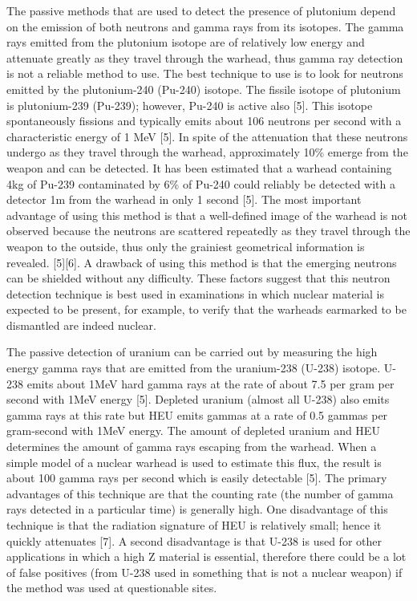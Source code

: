 \documentclass[twoside,titlepage,11pt,twocolumn,a4paper]{article}
\begin{document}
The passive methods that are used to detect the presence of plutonium
depend on the emission of both neutrons and gamma rays from its
isotopes. The gamma rays emitted from the plutonium isotope are of
relatively low energy and attenuate greatly as they travel through the
warhead, thus gamma ray detection is not a reliable method to use. The
best technique to use is to look for neutrons emitted by the
plutonium-240 (Pu-240) isotope. The fissile isotope of plutonium is
plutonium-239 (Pu-239); however, Pu-240 is active also [5]. This
isotope spontaneously fissions and typically emits about 106 neutrons
per second with a characteristic energy of 1 MeV [5]. In spite of the
attenuation that these neutrons undergo as they travel through the
warhead, approximately 10\% emerge from the weapon and can be
detected. It has been estimated that a warhead containing 4kg of
Pu-239 contaminated by 6\% of Pu-240 could reliably be detected with a
detector 1m from the warhead in only 1 second [5]. The most important
advantage of using this method is that a well-defined image of the
warhead is not observed because the neutrons are scattered repeatedly
as they travel through the weapon to the outside, thus only the
grainiest geometrical information is revealed. [5][6]. A drawback of
using this method is that the emerging neutrons can be shielded
without any difficulty. These factors suggest that this neutron
detection technique is best used in examinations in which nuclear
material is expected to be present, for example, to verify that the
warheads earmarked to be dismantled are indeed nuclear.

The passive detection of uranium can be carried out by measuring the
high energy gamma rays that are emitted from the uranium-238 (U-238)
isotope. U-238 emits about 1MeV hard gamma rays at the rate of about
7.5 per gram per second with 1MeV energy [5]. Depleted uranium (almost
all U-238) also emits gamma rays at this rate but HEU emits gammas at
a rate of 0.5 gammas per gram-second with 1MeV energy. The amount of
depleted uranium and HEU determines the amount of gamma rays escaping
from the warhead. When a simple model of a nuclear warhead is used to
estimate this flux, the result is about 100 gamma rays per second
which is easily detectable [5]. The primary advantages of this
technique are that the counting rate (the number of gamma rays
detected in a particular time) is generally high. One disadvantage of
this technique is that the radiation signature of HEU is relatively
small; hence it quickly attenuates [7]. A second disadvantage is that
U-238 is used for other applications in which a high Z material is
essential, therefore there could be a lot of false positives (from
U-238 used in something that is not a nuclear weapon) if the method
was used at questionable sites.
\end{document}
